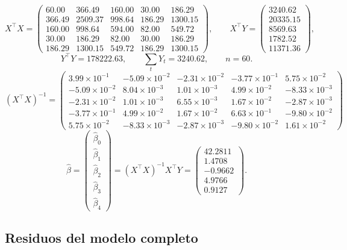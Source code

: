 \[
X^\top X=\begin{pmatrix}60.00 & 366.49 & 160.00 & 30.00 & 186.29\\366.49 & 2509.37 & 998.64 & 186.29 & 1300.15\\160.00 & 998.64 & 594.00 & 82.00 & 549.72\\30.00 & 186.29 & 82.00 & 30.00 & 186.29\\186.29 & 1300.15 & 549.72 & 186.29 & 1300.15\end{pmatrix},\qquad
X^\top Y=\begin{pmatrix}3240.62\\20335.15\\8569.63\\1782.52\\11371.36\end{pmatrix},
\]
\[
\textstyle Y^\top Y=178222.63,\qquad \sum_t Y_t=3240.62,\qquad n=60.
\]
{\small
\[
(X^\top X)^{-1}=\begin{pmatrix}3.99\times10^{-1} & -5.09\times10^{-2} & -2.31\times10^{-2} & -3.77\times10^{-1} & 5.75\times10^{-2}\\-5.09\times10^{-2} & 8.04\times10^{-3} & 1.01\times10^{-3} & 4.99\times10^{-2} & -8.33\times10^{-3}\\-2.31\times10^{-2} & 1.01\times10^{-3} & 6.55\times10^{-3} & 1.67\times10^{-2} & -2.87\times10^{-3}\\-3.77\times10^{-1} & 4.99\times10^{-2} & 1.67\times10^{-2} & 6.63\times10^{-1} & -9.80\times10^{-2}\\5.75\times10^{-2} & -8.33\times10^{-3} & -2.87\times10^{-3} & -9.80\times10^{-2} & 1.61\times10^{-2}\end{pmatrix}
\]}
\[
\hat\beta=\begin{pmatrix}\hat\beta_0\\\hat\beta_1\\\hat\beta_2\\\hat\beta_3\\\hat\beta_4\end{pmatrix}=(X^\top X)^{-1}X^\top Y=\begin{pmatrix}42.2811\\1.4708\\-0.9662\\4.9766\\0.9127\end{pmatrix}.
\]

\subsection*{Residuos del modelo completo}

